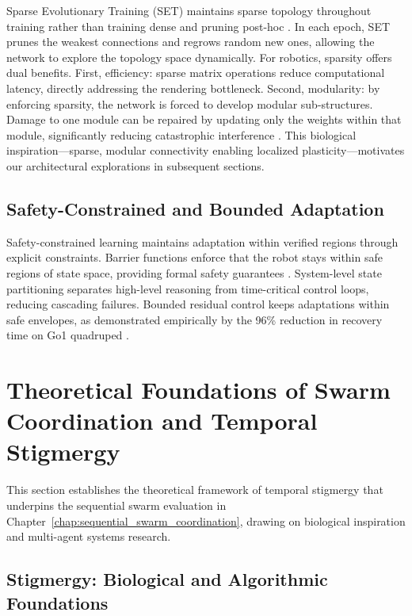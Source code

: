 \documentclass[12pt,a4paper,oneside]{report}
\begin{document}
Sparse Evolutionary Training (SET) maintains sparse topology throughout training rather than training dense and pruning post-hoc \cite{mocanu2018scalable}. In each epoch, SET prunes the weakest connections and regrows random new ones, allowing the network to explore the topology space dynamically. For robotics, sparsity offers dual benefits. First, efficiency: sparse matrix operations reduce computational latency, directly addressing the rendering bottleneck. Second, modularity: by enforcing sparsity, the network is forced to develop modular sub-structures. Damage to one module can be repaired by updating only the weights within that module, significantly reducing catastrophic interference \cite{frankle2018lottery, mocanu2018scalable}. This biological inspiration—sparse, modular connectivity enabling localized plasticity—motivates our architectural explorations in subsequent sections.

\subsection{Safety-Constrained and Bounded Adaptation}
\label{subsec:safety_constrained_and_bounded_adaptation}

Safety-constrained learning maintains adaptation within verified regions through explicit constraints. Barrier functions enforce that the robot stays within safe regions of state space, providing formal safety guarantees \cite{brunke2021safe}. System-level state partitioning separates high-level reasoning from time-critical control loops, reducing cascading failures. Bounded residual control keeps adaptations within safe envelopes, as demonstrated empirically by the 96\% reduction in recovery time on Go1 quadruped \cite{jayasinghe2026residual}.

\section{Theoretical Foundations of Swarm Coordination and Temporal Stigmergy}

This section establishes the theoretical framework of temporal stigmergy that underpins the sequential swarm evaluation in Chapter~\ref{chap:sequential_swarm_coordination}, drawing on biological inspiration and multi-agent systems research.

\subsection{Stigmergy: Biological and Algorithmic Foundations}
\label{subsec:stigmergy_biological_and_algorithmic_foundations}
\end{document}
